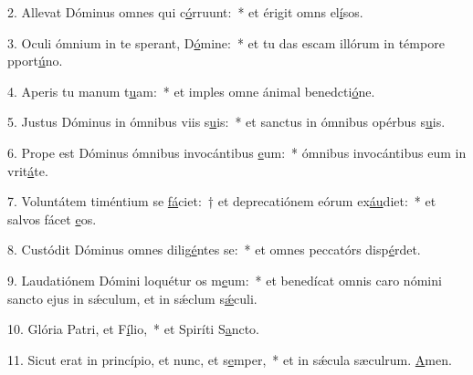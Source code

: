 2. Allevat Dóminus omnes qui c\uline{ó}rruunt:~* et érigit omns el\uline{í}sos.\par 
3. Oculi ómnium in te sperant, D\uline{ó}mine:~* et tu das escam illórum in témpore pport\uline{ú}no.\par 
4. Aperis tu manum t\uline{u}am:~* et imples omne ánimal benedcti\uline{ó}ne.\par 
5. Justus Dóminus in ómnibus viis s\uline{u}is:~* et sanctus in ómnibus opérbus s\uline{u}is.\par 
6. Prope est Dóminus ómnibus invocántibus \uline{e}um:~* ómnibus invocántibus eum in vrit\uline{á}te.\par 
7. Voluntátem timéntium se \uline{fá}ciet:~† et deprecatiónem eórum ex\uline{áu}diet:~* et salvos fácet \uline{e}os.\par 
8. Custódit Dóminus omnes dilig\uline{é}ntes se:~* et omnes peccatórs disp\uline{é}rdet.\par 
9. Laudatiónem Dómini loquétur os m\uline{e}um:~* et benedícat omnis caro nómini sancto ejus in sǽculum, et in sǽclum s\uline{ǽ}culi.\par 
10. Glória Patri, et F\uline{í}lio,~* et Spiríti S\uline{a}ncto.\par 
11. Sicut erat in princípio, et nunc, et s\uline{e}mper,~* et in sǽcula sæculrum. \uline{A}men.\par 
